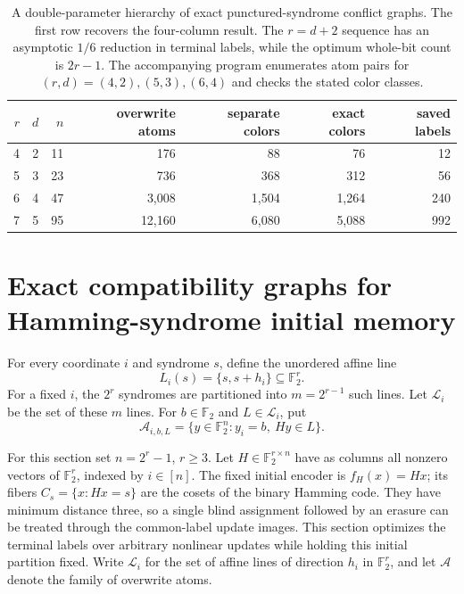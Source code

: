 \documentclass[11pt,a4paper]{article}
\begin{document}
\begin{table}[htbp]\centering\small
\begin{tabular}{@{}rrrrrrr@{}}\toprule
$r$ & $d$ & $n$ & overwrite atoms & separate colors & exact colors & saved labels\\\midrule
4 & 2 & 11 & 176 & 88 & 76 & 12\\
5 & 3 & 23 & 736 & 368 & 312 & 56\\
6 & 4 & 47 & 3,008 & 1,504 & 1,264 & 240\\
7 & 5 & 95 & 12,160 & 6,080 & 5,088 & 992\\\bottomrule
\end{tabular}
\caption{A double-parameter hierarchy of exact punctured-syndrome conflict graphs.
The first row recovers the four-column result. The $r=d+2$ sequence has
an asymptotic $1/6$ reduction in terminal labels, while the optimum whole-bit
count is $2r-1$. The accompanying program enumerates atom pairs for
$(r,d)=(4,2),(5,3),(6,4)$ and checks the stated color classes.}
\label{tab:plane-exact}
\end{table}

\section{Exact compatibility graphs for Hamming-syndrome initial memory}\label{sec:exactH}
For every coordinate $i$ and syndrome $s$, define the unordered affine line
\[
        L_i(s)=\{s,s+h_i\}\subseteq\mathbb F_2^r.
\]
For a fixed $i$, the $2^r$ syndromes are partitioned into $m=2^{r-1}$ such lines. Let $\mathscr L_i$ be the set of these $m$ lines. For $b\in\mathbb F_2$ and $L\in\mathscr L_i$, put
\[
   \mathcal A_{i,b,L}=\{y\in\mathbb F_2^n:y_i=b,\ Hy\in L\}.
\]

For this section set $n=2^r-1$, $r\ge3$. Let $H\in\mathbb F_2^{r\times n}$ have as columns all nonzero vectors of $\mathbb F_2^r$, indexed by $i\in[n]$. The fixed initial encoder is $f_H(x)=Hx$; its fibers $C_s=\{x:Hx=s\}$ are the cosets of the binary Hamming code. They have minimum distance three, so a single blind assignment followed by an erasure can be treated through the common-label update images. This section optimizes the terminal labels over arbitrary nonlinear updates while holding this initial partition fixed. Write $\mathscr L_i$ for the set of affine lines of direction $h_i$ in $\mathbb F_2^r$, and let $\mathcal A$ denote the family of overwrite atoms.
\end{document}
